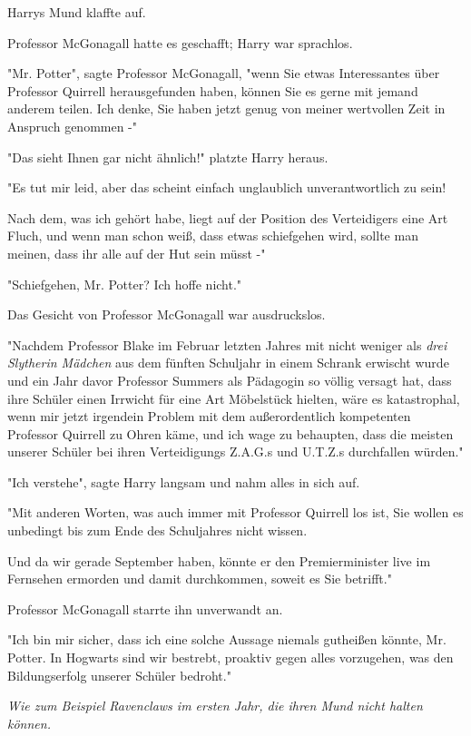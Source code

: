 {Harrys Mund klaffte auf.

Professor McGonagall hatte es geschafft; Harry war sprachlos.

"Mr. Potter", sagte Professor McGonagall, "wenn Sie etwas Interessantes über Professor Quirrell herausgefunden haben, können Sie es gerne mit jemand anderem teilen. Ich denke, Sie haben jetzt genug von meiner wertvollen Zeit in Anspruch genommen -"

"Das sieht Ihnen gar nicht ähnlich!" platzte Harry heraus.

"Es tut mir leid, aber das scheint einfach unglaublich unverantwortlich zu sein!

Nach dem, was ich gehört habe, liegt auf der Position des Verteidigers eine Art Fluch, und wenn man schon weiß, dass etwas schiefgehen wird, sollte man meinen, dass ihr alle auf der Hut sein müsst -"

"Schiefgehen, Mr. Potter? Ich hoffe nicht."

Das Gesicht von Professor McGonagall war ausdruckslos.

"Nachdem Professor Blake im Februar letzten Jahres mit nicht weniger als \emph{drei Slytherin Mädchen} aus dem fünften Schuljahr in einem Schrank erwischt wurde und ein Jahr davor Professor Summers als Pädagogin so völlig versagt hat, dass ihre Schüler einen Irrwicht für eine Art Möbelstück hielten, wäre es katastrophal, wenn mir jetzt irgendein Problem mit dem außerordentlich kompetenten Professor Quirrell zu Ohren käme, und ich wage zu behaupten, dass die meisten unserer Schüler bei ihren Verteidigungs Z.A.G.s und U.T.Z.s durchfallen würden."

"Ich verstehe", sagte Harry langsam und nahm alles in sich auf.

"Mit anderen Worten, was auch immer mit Professor Quirrell los ist, Sie wollen es unbedingt bis zum Ende des Schuljahres nicht wissen.

Und da wir gerade September haben, könnte er den Premierminister live im Fernsehen ermorden und damit durchkommen, soweit es Sie betrifft."

Professor McGonagall starrte ihn unverwandt an.

"Ich bin mir sicher, dass ich eine solche Aussage niemals gutheißen könnte, Mr. Potter. In Hogwarts sind wir bestrebt, proaktiv gegen alles vorzugehen, was den Bildungserfolg unserer Schüler bedroht."

\emph{Wie zum Beispiel Ravenclaws im ersten Jahr, die ihren Mund nicht halten können.}

}
